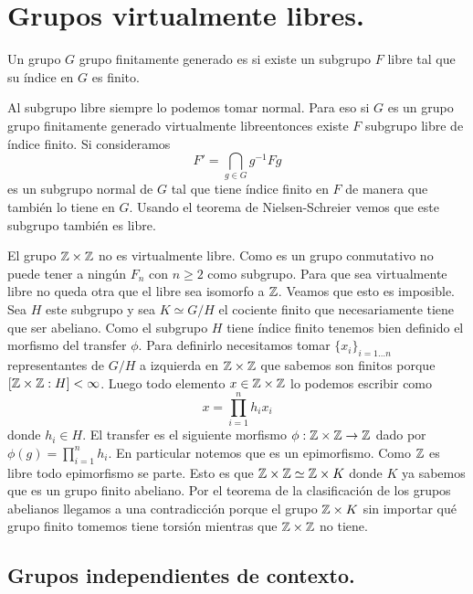 \documentclass[tesis.tex]{subfiles}
\newcommand{\fg}{grupo finitamente generado }
\newcommand{\vl}{virtualmente libre}
\begin{document}
	
\chapter{Grupos virtualmente libres.}
\begin{deff}
Un grupo $G$ \fg es  si existe un subgrupo $F$ libre tal que su índice en $G$ es finito.
\end{deff}

\begin{obs}
	Al subgrupo libre siempre lo podemos tomar normal.
	Para eso si $G$ es un grupo \fg \vl entonces existe $F$ subgrupo libre de índice finito.
	Si consideramos 
	\[
	F' = \bigcap_{g \in G} g^{-1}Fg
	\]
	es un subgrupo normal de $G$ tal que tiene índice finito en $F$ de manera que también lo tiene en $G$.	
	Usando el teorema de Nielsen-Schreier vemos que este subgrupo también es libre.
\end{obs}

\begin{ej}
	El grupo $\mathbb{Z} \times \mathbb{Z}$ no es virtualmente libre.
	Como es un grupo conmutativo no puede tener a ningún $F_n$ con $n \ge 2$ como subgrupo. 
	Para que sea virtualmente libre no queda otra que el libre sea isomorfo a $\mathbb{Z}$. 
	Veamos que esto es imposible.
	Sea $H$ este subgrupo y sea $K \simeq G/H$ el cociente finito que necesariamente tiene que ser abeliano.
	Como el subgrupo $H$ tiene índice finito tenemos bien definido el morfismo del transfer $\phi$.
	Para definirlo necesitamos tomar $\{ x_i \}_{i=1 \dots n}$ representantes de $G/H$ a izquierda en $\mathbb{Z} \times \mathbb{Z}$ que sabemos son finitos porque $[\mathbb{Z} \times \mathbb{Z} : H] < \infty$.
	Luego todo elemento $x \in \mathbb{Z} \times \mathbb{Z}$ lo podemos escribir como 
	\[
	x = \prod_{i=1}^{n} h_i x_i
	\]
	donde $h_i \in H$.
	El transfer es el siguiente morfismo $\phi: \mathbb{Z} \times \mathbb{Z} \to \mathbb{Z}$ dado por $\phi(g) = \prod_{i=1}^{n} h_i$.
	En particular notemos que es un epimorfismo.
	Como $\mathbb{Z}$ es libre todo epimorfismo se parte. 
	Esto es que $\mathbb{Z} \times \mathbb{Z}  \simeq \mathbb{Z} \times K$ donde $K$ ya sabemos que es un grupo finito abeliano.
	Por el teorema de la clasificación de los grupos abelianos llegamos a una contradicción porque el grupo $\mathbb{Z} \times K$ sin importar qué grupo finito tomemos tiene torsión mientras que $\mathbb{Z} \times \mathbb{Z}$ no tiene.	
\end{ej}






\section{Grupos independientes de contexto.}
 
\end{document}
